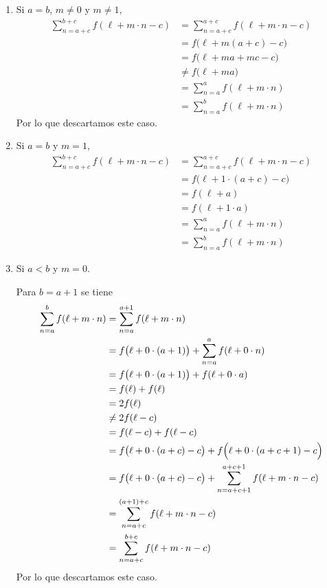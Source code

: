 \begin{enumerate}[label=\alph*)]
\begin{enumerate}[label=\Roman*)]
    \item Si $a=b$, $m\neq 0$ y $m\neq 1$,
    \begin{align*}
      \sum_{n=a+c}^{b+c} f(\ell+m\cdot n-c) &= \sum_{n=a+c}^{a+c} f(\ell+m\cdot n-c)\\
      &= f\bigl(\ell+m(a+c)-c\bigr)\\
      &= f\bigl(\ell+ma+mc-c\bigr)\\
      &\neq f\bigl(\ell+ma\bigr)\\
      &= \sum_{n=a}^a f(\ell+m\cdot n)\\
      &= \sum_{n=a}^b f(\ell+m\cdot n)
    \end{align*}
    Por lo que descartamos este caso.

    \item Si $a=b$ y $m=1$,
    \begin{align*}
      \sum_{n=a+c}^{b+c} f(\ell+m\cdot n-c) &= \sum_{n=a+c}^{a+c} f(\ell+m\cdot n-c)\\
      &= f\bigl(\ell+1\cdot (a+c)-c\bigr)\\
      &= f(\ell + a)\\
      &= f(\ell+1\cdot a)\\
      &= \sum_{n=a}^a f(\ell+m\cdot n)\\
      &= \sum_{n=a}^b f(\ell+m\cdot n)
    \end{align*}

    \item Si $a<b$ y $m=0$.
    
    Para $b=a+1$ se tiene
    \begin{align*}
      \sum_{n=a}^b f(\ell+m\cdot n) &=\sum_{n=a}^{a+1} f(\ell+m\cdot n)\\
      &= f\bigl(\ell+0\cdot (a+1)\bigr) + \sum_{n=a}^{a} f(\ell+0\cdot n)\\
      &= f\bigl(\ell+0\cdot (a+1)\bigr) + f(\ell+0\cdot a)\\
      &= f(\ell) + f(\ell)\\
      &= 2 f(\ell)\\
      &\neq 2 f(\ell - c) \\
      &= f(\ell-c) + f(\ell-c)\\
      &= f\bigl(\ell+0\cdot (a+c)-c\bigr) + f\Bigl(\ell +0\cdot (a+c+1)-c\Bigr)\\
      &= f\bigl(\ell+0\cdot (a+c)-c\bigr) + \sum_{n=a+c+1}^{a+c+1} f(\ell+m\cdot n-c)\\
      &= \sum_{n=a+c}^{(a+1)+c} f(\ell+m\cdot n-c)\\
      &= \sum_{n=a+c}^{b+c} f(\ell+m\cdot n-c)
    \end{align*}
    Por lo que descartamos este caso.


\end{enumerate}
\end{enumerate}
